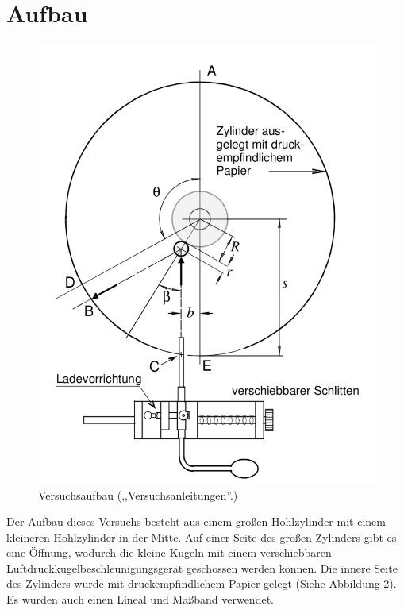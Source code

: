 \documentclass[11pt,a4paper]{article}
\begin{document}
\section{Aufbau}
\begin{figure}
	\centering
	\includegraphics[scale=0.4]{Abb3}
	\caption{Versuchsaufbau (,,Versuchsanleitungen''.)}
\end{figure}

Der Aufbau dieses Versuchs besteht aus einem großen Hohlzylinder mit einem kleineren Hohlzylinder in der Mitte. Auf einer Seite des großen Zylinders gibt es eine Öffnung, wodurch die kleine Kugeln mit einem verschiebbaren Luftdruckkugelbeschleunigungsgerät geschossen werden können. Die innere Seite des Zylinders wurde mit druckempfindlichem Papier gelegt (Siehe Abbildung 2). Es wurden auch einen Lineal und Maßband verwendet. 
\end{document}
